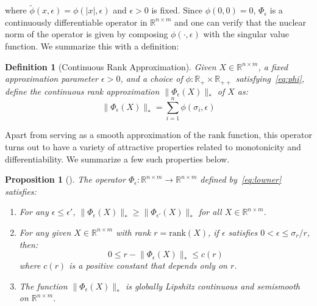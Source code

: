 \documentclass[10pt]{article}
\numberwithin{equation}{section}
\newcommand{\+}{%
	\raisebox{0.18ex}{\scaleobj{0.55}{+}}
}
\newtheorem{proposition}{Proposition}
\newtheorem{definition}{Definition}
\theoremstyle{definition}
\begin{document}
where $\tilde{\phi}(x, \epsilon) = \phi(\lvert x \rvert, \epsilon)$ and $\epsilon > 0$ is fixed. Since $\phi(0,0) = 0$, $\Phi_\epsilon$ is a continuously differentiable operator in $\mathbb{R}^{n \times m}$ and one can verify that the nuclear norm of the operator is given by composing $\phi(\cdot, \epsilon)$ with the singular value function. We summarize this with a definition:
\begin{definition}[Continuous Rank Approximation]
	Given $X \in \mathbb{R}^{n \times m}$, a fixed approximation parameter $\epsilon > 0$, and a choice of $\phi: \mathbb{R}_+ \times \mathbb{R}_{++}$ satisfying~\eqref{eq:phi}, define the \emph{continuous rank approximation} $\lVert \Phi_\epsilon(X) \rVert_\ast$ of $X$ as: 
	\begin{equation}\label{def:cont_rank}
		\lVert \Phi_\epsilon(X) \rVert_\ast = \sum\limits_{i=1}^n \phi(\sigma_i, \epsilon)
	\end{equation}
\end{definition}
\noindent Apart from serving as a smooth approximation of the $\mathrm{rank}$ function, this operator turns out to have a variety of attractive properties related to monotonicity and differentiability.
We summarize a few such properties below. 
\begin{proposition}[\cite{bi2013approximation}] The operator $\Phi_\epsilon: \mathbb{R}^{n \times m} \to \mathbb{R}^{n \times m}$ defined by~\eqref{eq:lowner} satisfies: 
	\begin{enumerate}
		\item For any $\epsilon \leq \epsilon'$, $\lVert \Phi_{\epsilon}(X) \rVert_\ast \geq \lVert \Phi_{\epsilon'}(X) \rVert_\ast$ for all $X \in \mathbb{R}^{n \times m}$.
		\item For any given $X \in \mathbb{R}^{n \times m}$ with rank $r = \mathrm{rank}(X)$, if $\epsilon$ satisfies $0 < \epsilon \leq \sigma_r / r$, then: 
		$$ 0 \leq r - \lVert \Phi_\epsilon(X) \rVert_\ast \leq c(r) $$
		where $c(r)$ is a positive constant that depends only on $r$. 
		\item The function $\lVert \Phi_\epsilon(X) \rVert_\ast$ is globally Lipshitz continuous and semismooth on $\mathbb{R}^{n \times m}$.
	\end{enumerate}
\end{proposition}
\end{document}
